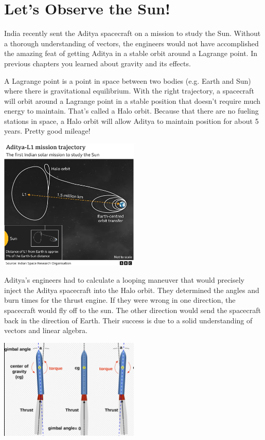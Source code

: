 \section{Let's Observe the Sun!}
India recently sent the Aditya spacecraft on a mission to study the Sun. Without a thorough understanding of vectors, the engineers would not have accomplished the amazing feat of getting Aditya in a stable orbit around a Lagrange point. In previous chapters you learned about gravity and its effects. 

A Lagrange point is a point in space between two bodies (e.g. Earth and Sun) where there is gravitational equilibrium. With the right trajectory, a spacecraft will orbit around a Lagrange point in a stable position that doesn’t require much energy to maintain. That’s called a Halo orbit. Because that there are no fueling stations in space, a Halo orbit will allow Aditya to maintain position for about 5 years. Pretty good mileage!

\includegraphics[width=0.5\textwidth]{orbit.png}

Aditya’s engineers had to calculate a looping maneuver that would precisely inject the Aditya spacecraft into the Halo orbit. They determined the angles and burn times for the thrust engine. If they were wrong in one direction, the spacecraft would fly off to the sun. The other direction would send the spacecraft back in the direction of Earth. Their success is due to a solid understanding of vectors and linear algebra.

\includegraphics[width=0.5\textwidth]{thrust.png}

